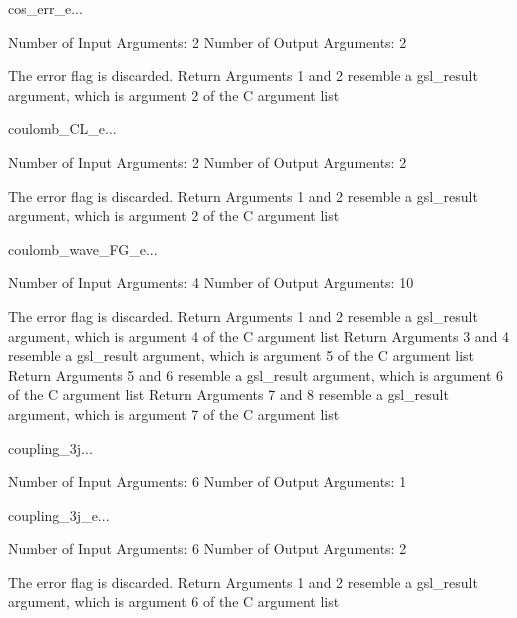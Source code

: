 \begin{funcdesc}{cos_err_e}{...}

    Number of Input  Arguments:  2
    Number of Output Arguments:  2

The error flag is discarded.
Return Arguments 1 and 2 resemble a gsl_result argument,
	which is  argument 2 of the C argument list

\end{funcdesc}

\begin{funcdesc}{coulomb_CL_e}{...}

    Number of Input  Arguments:  2
    Number of Output Arguments:  2

The error flag is discarded.
Return Arguments 1 and 2 resemble a gsl_result argument,
	which is  argument 2 of the C argument list

\end{funcdesc}

\begin{funcdesc}{coulomb_wave_FG_e}{...}

    Number of Input  Arguments:  4
    Number of Output Arguments: 10

The error flag is discarded.
Return Arguments 1 and 2 resemble a gsl_result argument,
	which is  argument 4 of the C argument list
Return Arguments 3 and 4 resemble a gsl_result argument,
	which is  argument 5 of the C argument list
Return Arguments 5 and 6 resemble a gsl_result argument,
	which is  argument 6 of the C argument list
Return Arguments 7 and 8 resemble a gsl_result argument,
	which is  argument 7 of the C argument list

\end{funcdesc}

\begin{funcdesc}{coupling_3j}{...}

    Number of Input  Arguments:  6
    Number of Output Arguments:  1
\end{funcdesc}

\begin{funcdesc}{coupling_3j_e}{...}

    Number of Input  Arguments:  6
    Number of Output Arguments:  2

The error flag is discarded.
Return Arguments 1 and 2 resemble a gsl_result argument,
	which is  argument 6 of the C argument list

\end{funcdesc}

